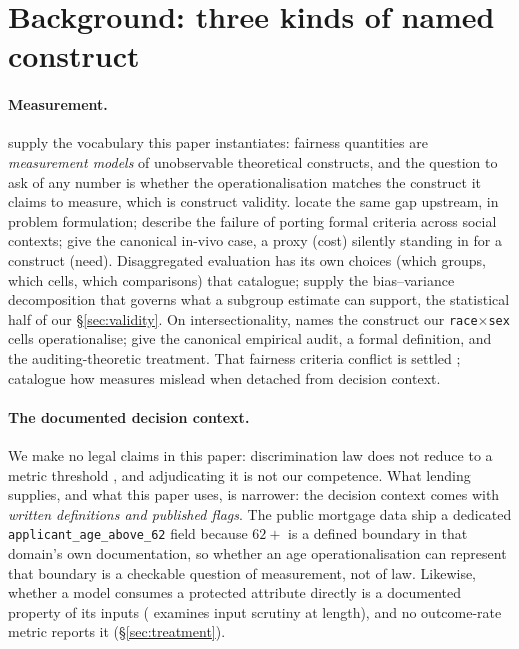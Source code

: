 \documentclass[sigconf,nonacm]{acmart}
\begin{document}
\section{Background: three kinds of named construct}
\label{sec:background}

\paragraph{Measurement.} \citet{jacobswallach2021} supply the vocabulary this
paper instantiates: fairness quantities are \emph{measurement models} of
unobservable theoretical constructs, and the question to ask of any number is
whether the operationalisation matches the construct it claims to measure,
which is construct validity. \citet{passi2019} locate the same gap upstream,
in problem
formulation; \citet{selbst2019} describe the failure of porting formal
criteria across social contexts; \citet{obermeyer2019} give the canonical
in-vivo case, a proxy (cost) silently standing in for a construct (need).
Disaggregated evaluation has its own choices (which groups, which cells,
which comparisons) that \citet{barocas2021} catalogue; \citet{chen2018}
supply the bias--variance decomposition that governs what a subgroup estimate
can support, the statistical half of our \S\ref{sec:validity}. On
intersectionality, \citet{crenshaw1989} names the construct our
\texttt{race}$\times$\texttt{sex} cells operationalise; \citet{buolamwini2018}
give the canonical empirical audit, \citet{foulds2020} a formal definition,
and \citet{kearns2018} the auditing-theoretic treatment. That fairness
criteria conflict is settled \citep{chouldechova2017,kleinberg2017,hardt2016};
\citet{corbettdavies2018} catalogue how measures mislead when detached from
decision context.

\paragraph{The documented decision context.} We make no legal claims in this
paper: discrimination law does not reduce to a metric threshold
\citep{barocas2016,wachter2021}, and adjudicating it is not our competence.
What lending supplies, and what this paper uses, is narrower: the decision
context comes with \emph{written definitions and published flags}. The public
mortgage data ship a dedicated \texttt{applicant\_age\_above\_62} field
because $62{+}$ is a defined boundary in that domain's own documentation, so
whether an age operationalisation can represent that boundary is a checkable
question of measurement, not of law. Likewise, whether a model consumes a
protected attribute directly is a documented property of its inputs
(\citet{gillis2022} examines input scrutiny at length), and no outcome-rate
metric reports it (\S\ref{sec:treatment}).
\end{document}
